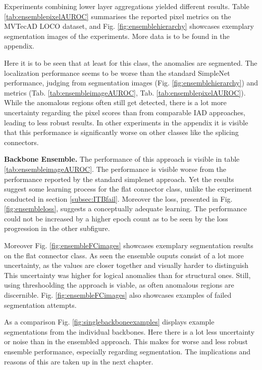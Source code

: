 


Experiments combining lower layer aggregations yielded different results. Table \ref{tab:ensemblepixelAUROC} summarises the reported pixel metrics on the MVTecAD LOCO \cite{LOCODentsAndScratchesBergmann2022} 
dataset, and Fig. \ref{fig:ensemblehierarchy} showcases exemplary 
segmentation images of the experiments. More data is to be found in the appendix.



Here it is to be seen that at least for this class, the anomalies are segmented. The localization performance seems to be worse than the standard SimpleNet \cite{liu2023simplenet} 
performance, judging from segmentation images (Fig. \ref{fig:ensemblehierarchy}) and metrics (Tab. \ref{tab:ensembleimageAUROC}, Tab. \ref{tab:ensemblepixelAUROC}). While the anomalous regions often still get detected, there is a lot more uncertainty regarding 
the pixel scores than from comparable IAD approaches, leading to less robust results. In other experiments in the appendix it is visible that this performance is significantly worse on 
other classes like the splicing connectors.



\textbf{Backbone Ensemble.} The performance of this approach is visible in table \ref{tab:ensembleimageAUROC}. The performance is visible worse from the performance 
reported by the standard simplenet approach. Yet the results suggest some learning process for the flat connector class, unlike the experiment conducted in section \ref{subsec:ITBfail}. 
Moreover the loss, presented in Fig. \ref{fig:ensembleloss}, suggests a conceptually adequate learning. The performance could not be increased by a higher 
epoch count as to be seen by the loss progression in the other subfigure.



Moreover Fig. \ref{fig:ensembleFCimages} showcases exemplary segmentation results on the flat connector class. As 
seen the ensemble ouputs consist of a lot more uncertainty, as the values are closer together and visually harder to distinguish This uncertainty 
was higher for logical anomalies than for structural ones. Still, 
using threshoolding the approach is viable, as often anomalous regions are discernible. Fig. \ref{fig:ensembleFCimages} also showcases examples of failed segmentation 
attempts. 



As a comparison Fig. \ref{fig:singlebackboneexamples} displays example segmentations from the individual backbones. Here there is a lot less uncertainty or 
noise than in the ensembled approach. This makes for worse and less robust ensemble performance, especially regarding segmentation. 
The implications and reasons of this are taken up in the next chapter.






